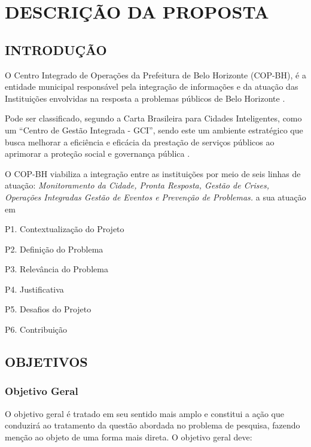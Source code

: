 
\chapter{DESCRIÇÃO DA PROPOSTA}
\label{chap:descricao}

\section{INTRODUÇÃO}
\label{sec:introducao}
O Centro Integrado de Operações da Prefeitura de Belo Horizonte (COP-BH), é a entidade municipal responsável pela integração de informações e da atuação das Instituições envolvidas na resposta a problemas públicos de Belo Horizonte \cite{ModeloGestaoCOP}.

Pode ser classificado, segundo a Carta Brasileira para Cidades Inteligentes, como um ``Centro de Gestão Integrada - GCI'', sendo este um ambiente estratégico que busca melhorar a eficiência e eficácia da prestação de serviços públicos ao aprimorar a proteção social e governança pública \cite{CartaCidades}.

O COP-BH viabiliza a integração entre as instituições por meio de seis linhas de atuação: \textit{Monitoramento da Cidade, Pronta Resposta, Gestão de Crises, Operações Integradas Gestão de Eventos e Prevenção de Problemas.} a sua atuação em 




P1. Contextualização do Projeto

P2. Definição do Problema

P3. Relevância do Problema

P4. Justificativa

P5. Desafios do Projeto

P6. Contribuição


\section{OBJETIVOS}
\label{sec:objetivos}

\subsection{Objetivo Geral}
\label{subsec:objgeral}
O objetivo geral é tratado em seu sentido mais amplo e constitui a ação que conduzirá ao tratamento da questão abordada no problema de pesquisa, fazendo menção ao objeto de uma forma mais direta. O objetivo geral deve:

